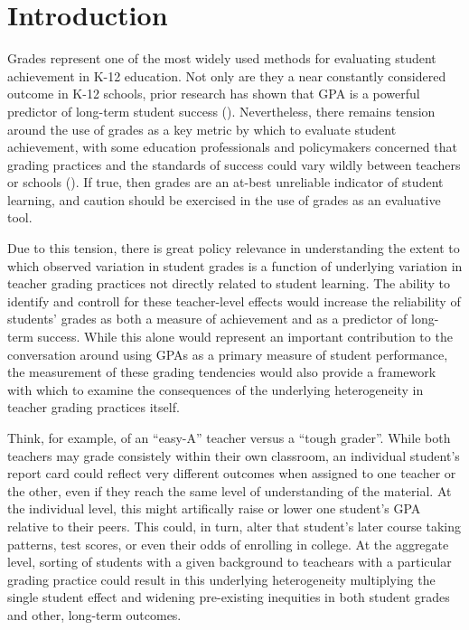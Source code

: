 \documentclass[../thesis_main.tex]{subfiles}
\begin{document}
\doublespacing
\section{Introduction}

Grades represent one of the most widely used methods for evaluating student achievement in K-12 education. Not only are they a near constantly considered outcome in K-12 schools, prior research has shown that GPA is a powerful predictor of long-term student success (\citealt{allensworthHighSchoolGPAs2020, eastonPredictivePowerNinthGrade2017}). Nevertheless, there remains tension around the use of grades as a key metric by which to evaluate student achievement, with some education professionals and policymakers concerned that grading practices and the standards of success could vary wildly between teachers or schools (\citealt{gershensonGradeInflationHigh2018}). If true, then grades are an at-best unreliable indicator of student learning, and caution should be exercised in the use of grades as an evaluative tool. 

Due to this tension, there is great policy relevance in understanding the extent to which observed variation in student grades is a function of underlying variation in teacher grading practices not directly related to student learning. The ability to identify and controll for these teacher-level effects would increase the reliability of students' grades as both a measure of achievement and as a predictor of long-term success. While this alone would represent an important contribution to the conversation around using GPAs as a primary measure of student performance, the measurement of these grading tendencies would also provide a framework with which to examine the consequences of the underlying heterogeneity in teacher grading practices itself.

Think, for example, of an ``easy-A'' teacher versus a ``tough grader''. While both teachers may grade consistely within their own classroom, an individual student's report card could reflect very different outcomes when assigned to one teacher or the other, even if they reach the same level of understanding of the material. At the individual level, this might artifically raise or lower one student's GPA relative to their peers. This could, in turn, alter that student's later course taking patterns, test scores, or even their odds of enrolling in college. At the aggregate level, sorting of students with a given background to teachears with a particular grading practice could result in this underlying heterogeneity multiplying the single student effect and widening pre-existing inequities in both student grades and other, long-term outcomes. 
\end{document}
